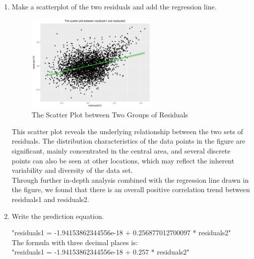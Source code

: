 \documentclass[12pt,letterpaper]{article}
\begin{document}
\begin{enumerate}
		\item Make a scatterplot of the two residuals and add the regression line. 	\vspace{1cm}
		

\begin{figure}[h!]
	\caption{\footnotesize{The Scatter Plot between Two Groups of Residuals}}
	\vspace{.5cm}
	\centering
	\label{fig:4.2}
	\includegraphics[width=0.6\textwidth]{residuals1_residuals2_scatterplot.pdf}
\end{figure}
	\vspace{5cm}		
	
This scatter plot reveals the underlying relationship between the two sets of residuals. The distribution characteristics of the data points in the figure are significant, mainly concentrated in the central area, and several discrete points can also be seen at other locations, which may reflect the inherent variability and diversity of the data set.\\
Through further in-depth analysis combined with the regression line drawn in the figure, we found that there is an overall positive correlation trend between residuals1 and residuals2.\\

		\item Write the prediction equation.
		
		"residuals1 = -1.94153862344556e-18 + 0.256877012700097 * residuals2"\\
		The formula with three decimal places is:\\
		"residuals1 = -1.94153862344556e-18 + 0.257 * residuals2"\\
	\end{enumerate}
	
	\newpage	
\end{document}

